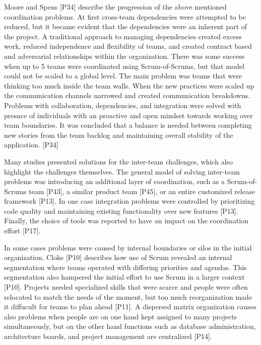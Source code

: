 \documentclass[preprint,authoryear,12pt]{elsarticle}
\begin{document}
Moore and Spens [P34] describe the progression of the above mentioned
coordination problems. At first cross-team dependencies were attempted to be
reduced, but it became evident that the dependencies were an inherent part of
the project. A traditional approach to managing dependencies created excess
work, reduced independence and flexibility of teams, and created contract based
and adversarial relationships within the organization. There was some success
when up to 5 teams were coordinated using Scrum-of-Scrums, but that model could
not be scaled to a global level. The main problem was teams that were thinking
too much inside the team walls. When the new practices were scaled up the
communication channels narrowed and created communication breakdowns. Problems
with collaboration, dependencies, and integration were solved with presnce of
individuals with an proactive and open mindset towards working over team
boundaries. It was concluded that a balance is needed between completing new
stories from the team backlog and maintaining overall stability of the
application. [P34]

Many studies presented solutions for the inter-team challenges, which also
highlight the challenges themselves. The general model of solving inter-team
problems was introducing an additional layer of coordination, such as a
Scrum-of-Scrums team [P43], a similar product team [P45], or an entire
customized release framework [P13]. In one case integration problems were
controlled by prioritizing code quality and maintaining existing functionality
over new features [P13]. Finally, the choice of tools was reported to have an
impact on the coordination effort [P17].




In some cases problems were caused by internal boundaries or silos in the
initial organization. Cloke [P10] describes how use of Scrum revealed an
internal segmentation where teams operated with differing priorities and
agendas. This segmentation also hampered the initial effort to use Scrum in a
larger context [P10].
Projects needed specialized skills that were scarce and people were often
relocated to match the needs of the moment, but too much reorganization made
it diffucult for teams to plan ahead [P11].
A dispersed matrix organization causes also problems when people are on one hand
kept assigned to many projects simultaneously, but on the other hand functions
such as database administration, architecture boards, and project management are
centralized [P14].
\end{document}
